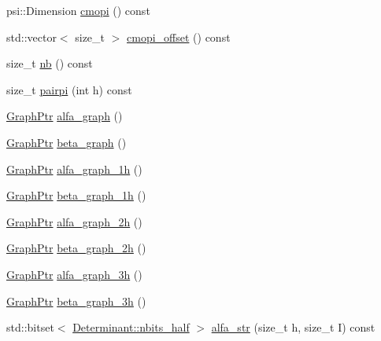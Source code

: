 \begin{DoxyCompactItemize}
\item 
psi\+::\+Dimension \mbox{\hyperlink{classforte_1_1_string_lists_a879108b6547ae5a4e70b3d9adb3b32b2}{cmopi}} () const
\item 
std\+::vector$<$ size\+\_\+t $>$ \mbox{\hyperlink{classforte_1_1_string_lists_ab74131ac7de12d028f594e060be442e0}{cmopi\+\_\+offset}} () const
\item 
size\+\_\+t \mbox{\hyperlink{classforte_1_1_string_lists_afe2c8c337d3e77fc5d1fd0f033dc5959}{nb}} () const
\item 
size\+\_\+t \mbox{\hyperlink{classforte_1_1_string_lists_a2913e620da165dec9437a58296fc1254}{pairpi}} (int h) const
\item 
\mbox{\hyperlink{namespaceforte_a4669cbddcd761bcaee151bc7cff6c444}{Graph\+Ptr}} \mbox{\hyperlink{classforte_1_1_string_lists_ad5079ac32df7f418a51105d54e23616e}{alfa\+\_\+graph}} ()
\item 
\mbox{\hyperlink{namespaceforte_a4669cbddcd761bcaee151bc7cff6c444}{Graph\+Ptr}} \mbox{\hyperlink{classforte_1_1_string_lists_afb67086a8188199389fd53fc091ac31a}{beta\+\_\+graph}} ()
\item 
\mbox{\hyperlink{namespaceforte_a4669cbddcd761bcaee151bc7cff6c444}{Graph\+Ptr}} \mbox{\hyperlink{classforte_1_1_string_lists_a9a455e7eb60d305755070ed8cc984262}{alfa\+\_\+graph\+\_\+1h}} ()
\item 
\mbox{\hyperlink{namespaceforte_a4669cbddcd761bcaee151bc7cff6c444}{Graph\+Ptr}} \mbox{\hyperlink{classforte_1_1_string_lists_a8e289c38f171e308dabc5b4b547c658e}{beta\+\_\+graph\+\_\+1h}} ()
\item 
\mbox{\hyperlink{namespaceforte_a4669cbddcd761bcaee151bc7cff6c444}{Graph\+Ptr}} \mbox{\hyperlink{classforte_1_1_string_lists_ad3e349bdcc6f08abc5330d67a9e9bc74}{alfa\+\_\+graph\+\_\+2h}} ()
\item 
\mbox{\hyperlink{namespaceforte_a4669cbddcd761bcaee151bc7cff6c444}{Graph\+Ptr}} \mbox{\hyperlink{classforte_1_1_string_lists_a8723a60dcd6dc9aaf91b913594b95efc}{beta\+\_\+graph\+\_\+2h}} ()
\item 
\mbox{\hyperlink{namespaceforte_a4669cbddcd761bcaee151bc7cff6c444}{Graph\+Ptr}} \mbox{\hyperlink{classforte_1_1_string_lists_a8f7724f157b07db86a26838b41523480}{alfa\+\_\+graph\+\_\+3h}} ()
\item 
\mbox{\hyperlink{namespaceforte_a4669cbddcd761bcaee151bc7cff6c444}{Graph\+Ptr}} \mbox{\hyperlink{classforte_1_1_string_lists_ae4079600b5f8c9fd58fbc23613717a8a}{beta\+\_\+graph\+\_\+3h}} ()
\item 
std\+::bitset$<$ \mbox{\hyperlink{classforte_1_1_determinant_impl_ac8d2a64c2fb785ccb79b1cecc553d63d}{Determinant\+::nbits\+\_\+half}} $>$ \mbox{\hyperlink{classforte_1_1_string_lists_ad42bebe13677b64473716efed3dbbc3a}{alfa\+\_\+str}} (size\+\_\+t h, size\+\_\+t I) const

\end{DoxyCompactItemize}

